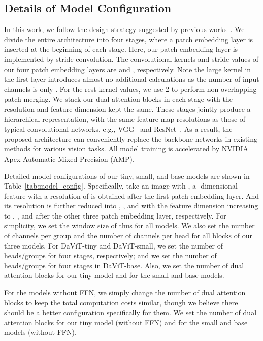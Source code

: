 \documentclass[runningheads]{llncs}
\newcommand{\model}{DaViT\xspace}
\begin{document}
\subsection{Details of Model Configuration}
In this work, we follow the design strategy suggested by previous works~\cite{liu2021swin,yang2021focal}.
We divide the entire architecture into four stages, where a patch embedding layer is inserted at the beginning of each stage.
Here, our patch embedding layer is implemented by stride convolution. The convolutional kernels and stride values of our four patch embedding layers are  and , respectively.
Note the large kernel in the first layer introduces almost no additional calculations as the number of input channels is only . For the rest kernel values, we use 2 to perform non-overlapping patch merging.
We stack our dual attention blocks in each stage with the resolution and feature dimension kept the same.
These stages jointly produce a hierarchical representation, with the same feature map resolutions as those of typical convolutional networks, e.g., VGG~\cite{simonyan2014very} and ResNet~\cite{he2016deep}.
As a result, the proposed architecture can conveniently replace the backbone networks in existing methods for various vision tasks.
All model training is accelerated by NVIDIA Apex Automatic Mixed Precision (AMP).


Detailed model configurations of our tiny, small, and base models are shown in Table~\ref{tab:model_config}. 
Specifically, take an image with , a -dimensional feature with a resolution of  is obtained after the first patch embedding layer. And its resolution is further reduced into , , and  with the feature dimension increasing to , , and  after the other three patch embedding layer, respectively.
For simplicity, we set the window size of  thus  for all models. We also set the number of channels per group  and the number of channels per head  for all blocks of our three models.
For \model-tiny and \model-small, we set the number of heads/groups  for four stages, respectively; and we set the number of heads/groups  for four stages in \model-base.
Also, we set the number of dual attention blocks  for our tiny model and  for the small and base models.

For the models without FFN, we simply change the number of dual attention blocks to keep the total computation costs similar, though we believe there should be a better configuration specifically for them. We set the number of dual attention blocks  for our tiny model (without FFN) and  for the small and base models (without FFN).
\end{document}
